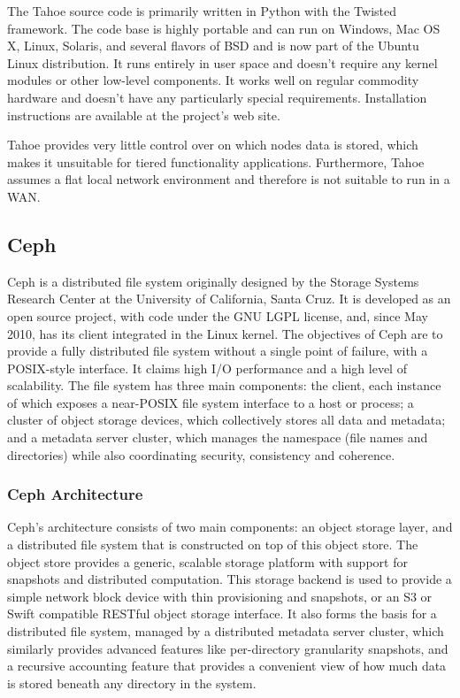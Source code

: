 \documentclass[11pt]{article}
\begin{document}
The Tahoe source code is primarily written in Python with the Twisted 
framework. The code base is highly portable and can run on Windows, 
Mac OS X, Linux, Solaris, and several flavors of BSD and is now part 
of the Ubuntu Linux distribution. It runs entirely in user space and 
doesn't require any kernel modules or other low-level components. It 
works well on regular commodity hardware and doesn't have any particularly 
special requirements. Installation instructions are available at the 
project's web site.

Tahoe provides very little control over on which nodes data is stored, 
which makes it unsuitable for tiered functionality applications. 
Furthermore, Tahoe assumes a flat local network environment and 
therefore is not suitable to run in a WAN. 


\subsection{Ceph}
Ceph is a distributed file system originally designed by the Storage 
Systems Research Center at the University of California, Santa Cruz. 
It is developed as an open source project, with code under the GNU LGPL 
license, and, since May 2010, has its client integrated in the Linux 
kernel. The objectives of Ceph are to provide a fully distributed file 
system without a single point of failure, with a POSIX-style interface. 
It claims high I/O performance and a high level of scalability. The 
file system has three main components: the client, each instance of 
which exposes a near-POSIX file system interface to a host or process; 
a cluster of object storage devices, which collectively stores all 
data and metadata; and a metadata server cluster, which manages the 
namespace (file names and directories) while also coordinating 
security, consistency and coherence.

\subsubsection{Ceph Architecture}
Ceph's architecture consists of two main components: an object storage 
layer, and a distributed file system that is constructed on top of 
this object store. The object store provides a generic, scalable 
storage platform with support for snapshots and distributed computation. 
This storage backend is used to provide a simple network block device  
with thin provisioning and snapshots, or an S3 or Swift compatible RESTful 
object storage interface. It also forms the basis for a distributed file 
system, managed by a distributed metadata server cluster, which similarly 
provides advanced features like per-directory granularity snapshots, and a 
recursive accounting feature that provides a convenient view of how much 
data is stored beneath any directory in the system.
\end{document}
